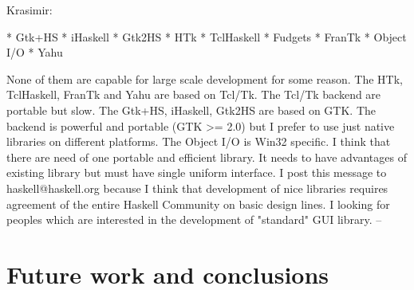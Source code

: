 Krasimir:

  * Gtk+HS
   * iHaskell
   * Gtk2HS
   * HTk
   * TclHaskell
   * Fudgets
   * FranTk
   * Object I/O
   * Yahu

None of them are capable for large scale development 
for some reason. The HTk, TclHaskell, FranTk and Yahu 
are based on Tcl/Tk. The Tcl/Tk backend are portable 
but slow. The Gtk+HS, iHaskell, Gtk2HS are based on
GTK. The backend is powerful and portable (GTK >= 2.0)
but I prefer to use just native libraries on 
different platforms. The Object I/O is Win32 specific.
I think that there are need of one portable and 
efficient library. It needs to have advantages of
existing library but must have single uniform
interface. I post this message to haskell@haskell.org 
because I think that development of nice libraries 
requires agreement of the entire Haskell Community on
basic design lines. I looking for peoples which are
interested in the development of "standard" GUI
library.
--
\section{Future work and conclusions}
